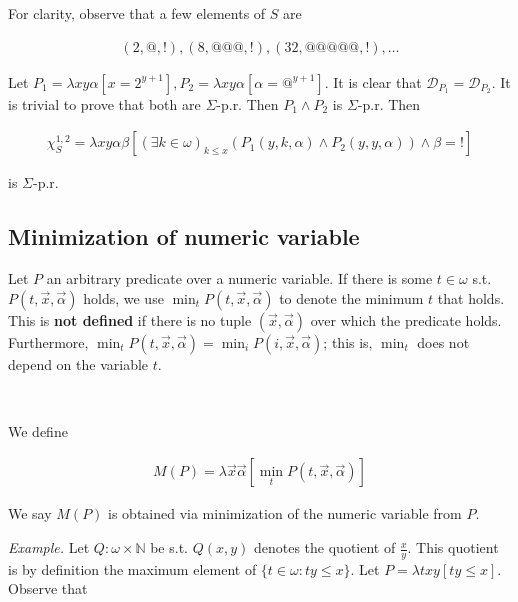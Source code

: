 \documentclass[a4paper, 12pt]{article}
\begin{document}
For clarity, observe that a few elements of
$S$ are 

\begin{align*}
    (2, @, !), (8, @@@, !), (32, @@@@@, !), \ldots
\end{align*}


Let $P_1 = \lambda xy\alpha \left[ x = 2^{y +1} \right], P_2 =
\lambda xy\alpha[\alpha = @^{y + 1}] $. It is clear that $\mathcal{D}_{P_1} =
\mathcal{D}_{P_2}$. It is trivial to prove that both are $\Sigma$-p.r. Then $P_1
\land P_2$ is $\Sigma$-p.r. Then

\begin{align*}
    \chi_{S}^{1, 2} = \lambda xy \alpha \beta \left[ (\exists k \in \omega)_{k \leq
        x} \left( P_1(y, k, \alpha) \land P_2(y, y, \alpha)\right) 
 \land \beta = !  \right] 
\end{align*}

is $\Sigma$-p.r.


\subsection{Minimization of numeric variable}

Let $P$ an arbitrary predicate over a numeric variable. If there is some $t \in
\omega$ s.t. $P(t, \overrightarrow{x}, \overrightarrow{\alpha})$ holds, we use
$\min_{t} P(t, \overrightarrow{x}, \overrightarrow{\alpha})$ to denote the
minimum $t$ that holds. This is \textbf{not defined} if there is no tuple
$(\overrightarrow{x}, \overrightarrow{\alpha})$ over which the predicate holds.
Furthermore, $\min_t P(t, \overrightarrow{x}, \overrightarrow{\alpha}) = \min_i
P(i, \overrightarrow{x}, \overrightarrow{\alpha})$; this is, $\min_t$ does not
depend on the variable $t$.

~ 

We define 

\begin{align*}
    M(P) = \lambda \overrightarrow{x}\overrightarrow{\alpha} \left[ \min_t P(t,
    \overrightarrow{x}, \overrightarrow{\alpha}) \right] 
\end{align*}

We say $M(P)$ is obtained via minimization of the numeric variable from $P$.

\textit{Example.} Let $Q : \omega \times \mathbb{N}$ be s.t. $Q(x, y)$ denotes
the quotient of $\frac{x}{y}$. This quotient is by definition the maximum
element of $\{t \in \omega : ty \leq x\}$. Let $P = \lambda txy \left[ ty \leq x
\right] $. Observe that 
\end{document}
